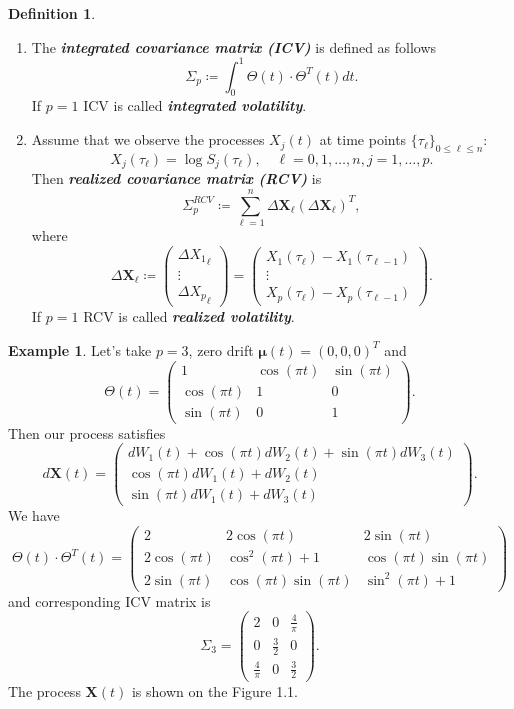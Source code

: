\documentclass[a4paper,11pt]{book}
\theoremstyle{plain}
\theoremstyle{definition}
\newtheorem{defn}[thm]{Definition}
\newtheorem{exmp}[thm]{Example}
\newcommand{\define}[1]{\textit{\textbf{#1}}}
\begin{document}
	\begin{defn} \
		\begin{enumerate}
			\item The \define{integrated covariance matrix (ICV)} is defined as follows
			\[\Sigma_p \coloneqq \int_0^1\Theta(t) \cdot \Theta^T(t) dt.\]
			If $p=1$ ICV is called \define{integrated volatility}.
			\item Assume that we observe the processes $X_j(t)$ at time points $ \{\tau_\ell\}_{0 \leq \ell \leq n}$:
			\[ X_j(\tau_\ell) = \log S_j(\tau_\ell), \quad \ell = 0, 1, \dots, n, j = 1, \dots, p. \]
			 Then \define{realized covariance matrix (RCV)} is
			\begin{equation} \label{RCV}
				\Sigma_p^{RCV} \coloneqq \sum_{\ell=1}^{n}\Delta \mathbf{X}_\ell(\Delta \mathbf{X}_\ell)^T,
			\end{equation}
			where 
			\[ \Delta \mathbf{X}_\ell \coloneqq
			\begin{pmatrix}
			\Delta {X_1}_\ell \\
			\vdots \\
			\Delta {X_p}_\ell
			\end{pmatrix}
			=
			\begin{pmatrix}
			X_1(\tau_{\ell}) - X_1(\tau_{\ell-1}) \\
			\vdots \\
			X_p(\tau_{\ell}) - X_p(\tau_{\ell-1})
			\end{pmatrix}. \]
			If $p=1$ RCV is called \define{realized volatility}.
		\end{enumerate}
	\end{defn}
	
	\begin{exmp} \label{exmp X3}
	    Let's take $p = 3$, zero drift $\boldsymbol{\mu}(t) = (0, 0, 0)^T$ and 
		\[ \Theta(t) = \begin{pmatrix}
		1 & \cos(\pi t) & \sin (\pi t) \\
		\cos(\pi t) & 1 & 0 \\
		\sin (\pi t) & 0 & 1
		\end{pmatrix}. \]
		Then our process satisfies
		\[ d\mathbf{X}(t) = \begin{pmatrix}
		dW_1(t)+\cos(\pi t) dW_2(t) +\sin(\pi t)dW_3(t)  \\
	    \cos(\pi t) dW_1(t) + dW_2(t) \\
		\sin(\pi t) dW_1(t)+ dW_3(t)
		\end{pmatrix}. \]
		We have
		\[ \Theta(t) \cdot \Theta^T(t) = \begin{pmatrix}
		2 & 2\cos(\pi t) & 2\sin (\pi t) \\
		2\cos(\pi t) & \cos^2(\pi t) + 1 & \cos(\pi t)\sin(\pi t) \\
		2\sin (\pi t) & \cos(\pi t)\sin(\pi t) & \sin^2(\pi t)+1
		\end{pmatrix} \]
		and corresponding ICV matrix is
		\[ \Sigma_3 = \begin{pmatrix}
		2 & 0 & \frac{4}{\pi} \\
		0 & \frac{3}{2} & 0 \\
		\frac{4}{\pi} & 0 & \frac{3}{2}
		\end{pmatrix}. \]
		The process $\mathbf{X}(t)$ is shown on the Figure 1.1.
	\end{exmp}
	
\end{document}
